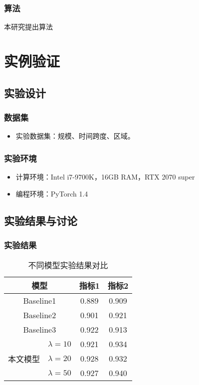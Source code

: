 \documentclass[AutoFakeBold,AutoFakeSlant]{beamer}
\begin{document}
\begin{frame}
  \frametitle{算法}

  \begin{algorithm}[H]
  \footnotesize
  \caption{本研究提出算法}
  \label{algo}
  \end{algorithm}
\end{frame}

\section{实例验证}

\subsection{实验设计}
\begin{frame}
  \frametitle{数据集}

  \begin{itemize}
    \item 实验数据集：规模、时间跨度、区域。
  \end{itemize}
\end{frame}

\begin{frame}
  \frametitle{实验环境}

  \begin{itemize}
    \item 计算环境：Intel i7-9700K，16GB RAM，RTX 2070 super
    \item 编程环境：PyTorch 1.4
  \end{itemize}
\end{frame}

\subsection{实验结果与讨论}

\begin{frame}
  \frametitle{实验结果}

  \begin{table}[ht]
  \footnotesize
  \caption{不同模型实验结果对比}
  \centering
  \begin{tabular}{clcc}
  \toprule
  \multicolumn{2}{c}{\textbf{模型}} & \textbf{指标1} & \textbf{指标2} \\
  \midrule
  \multicolumn{2}{c}{Baseline1} & 0.889 & 0.909 \\
  \multicolumn{2}{c}{Baseline2} & 0.901 & 0.921 \\
  \multicolumn{2}{c}{Baseline3} & 0.922 & 0.913 \\
  \midrule
  \multirow{3}{*}{本文模型} & $\lambda=10$ & 0.921 & 0.934 \\
  & $\lambda=20$ & 0.928 & 0.932 \\
  & $\lambda=50$ & 0.927 & 0.940 \\
  \bottomrule
  \end{tabular}
  \label{result}
  \end{table}
\end{frame}
\end{document}
